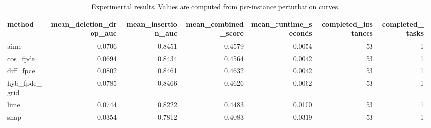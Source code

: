 \begin{table}[t]
\caption{Experimental results. Values are computed from per-instance perturbation curves.}
\label{tab:main_results_computed}
\centering
\begin{tabular}{lrrrrrr}
\toprule
method & mean\_deletion\_drop\_auc & mean\_insertion\_auc & mean\_combined\_score & mean\_runtime\_seconds & completed\_instances & completed\_tasks \\
\midrule
aime & 0.0706 & 0.8451 & 0.4579 & 0.0054 & 53 & 1 \\
cos\_fpde & 0.0694 & 0.8434 & 0.4564 & 0.0042 & 53 & 1 \\
diff\_fpde & 0.0802 & 0.8461 & 0.4632 & 0.0042 & 53 & 1 \\
hyb\_fpde\_grid & 0.0785 & 0.8466 & 0.4626 & 0.0062 & 53 & 1 \\
lime & 0.0744 & 0.8222 & 0.4483 & 0.0100 & 53 & 1 \\
shap & 0.0354 & 0.7812 & 0.4083 & 0.0319 & 53 & 1 \\
\bottomrule
\end{tabular}

\end{table}
